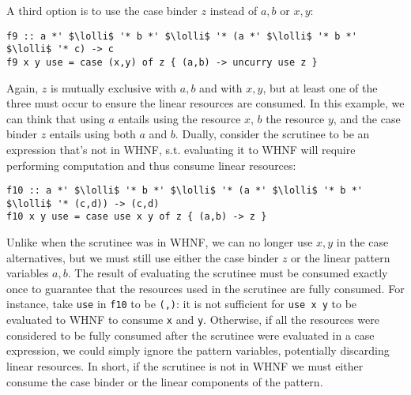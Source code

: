 \documentclass[acmsmall,review,anonymous]{acmart}
\newcommand{\incode}[1]{\lstinline{#1}}
\newcommand{\lolli}{\multimap}
\begin{document}
A third option is to use the case binder $z$ instead of $a,b$ or $x,y$:
\begin{notyet}
\begin{lstlisting}
f9 :: a *' $\lolli$ '* b *' $\lolli$ '* (a *' $\lolli$ '* b *' $\lolli$ '* c) -> c
f9 x y use = case (x,y) of z { (a,b) -> uncurry use z }
\end{lstlisting}
\end{notyet}
Again, $z$ is mutually exclusive with $a,b$ and with $x,y$, but at least one of
the three must occur to ensure the linear resources are consumed. In this
example, we can think that using $a$ entails using the resource $x$, $b$ the
resource $y$, and the case binder $z$ entails using both $a$ and $b$.
%
Dually, consider the scrutinee to be an expression that's not in WHNF, s.t.
evaluating it to WHNF will require performing computation and thus consume linear
resources:
\begin{notyet}
\begin{lstlisting}
f10 :: a *' $\lolli$ '* b *' $\lolli$ '* (a *' $\lolli$ '* b *' $\lolli$ '* (c,d)) -> (c,d)
f10 x y use = case use x y of z { (a,b) -> z }
\end{lstlisting}
\end{notyet}
Unlike when the scrutinee was in WHNF, we can no longer use $x,y$ in the case
alternatives, but we must still use either the case binder $z$ or the linear
pattern variables $a,b$. %
%
%
The result of evaluating the scrutinee must be consumed exactly once to guarantee
that the resources used in the scrutinee are fully consumed. %
For instance, take
\incode{use} in \incode{f10} to be \incode{(,)}: it is not sufficient for \incode{use x y} to be
evaluated to WHNF to consume \incode{x} and \incode{y}. Otherwise, if all the resources were
considered to be fully consumed after the scrutinee were evaluated in a case
expression, we could simply ignore the pattern variables, potentially
discarding linear resources. In
short, if the scrutinee is not in WHNF we must either consume the case binder
or the linear components of the pattern.
\end{document}
